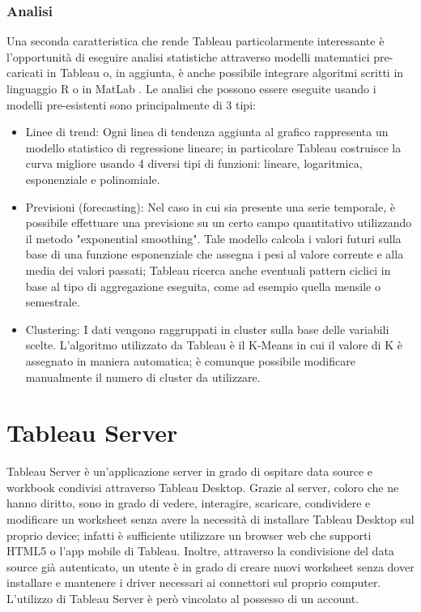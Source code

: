 \subsubsection{Analisi}

Una seconda caratteristica che rende Tableau particolarmente interessante è l'opportunità di eseguire analisi statistiche attraverso modelli matematici pre-caricati in Tableau o, in aggiunta, è anche possibile integrare algoritmi scritti in linguaggio R o in MatLab \cite{analisi_tableau}. Le analisi che possono essere eseguite usando i modelli pre-esistenti sono principalmente di 3 tipi:

\begin{itemize}
    \item Linee di trend: Ogni linea di tendenza aggiunta al grafico rappresenta un modello statistico di regressione lineare; in particolare Tableau costruisce la curva migliore usando 4 diversi tipi di funzioni: lineare, logaritmica, esponenziale e polinomiale.
    \item Previsioni (forecasting): Nel caso in cui sia presente una serie temporale, è possibile effettuare una previsione su un certo campo quantitativo utilizzando il metodo "exponential smoothing". Tale modello calcola i valori futuri sulla base di una funzione esponenziale che assegna i pesi al valore corrente e alla media dei valori passati; Tableau ricerca anche eventuali pattern ciclici in base al tipo di aggregazione eseguita, come ad esempio quella mensile o semestrale.
    \item Clustering: I dati vengono raggruppati in cluster sulla base delle variabili scelte. L'algoritmo utilizzato da Tableau è il K-Means in cui il valore di K è assegnato in maniera automatica; è comunque possibile modificare manualmente il numero di cluster da utilizzare.
\end{itemize}

\section{Tableau Server}

Tableau Server è un'applicazione server in grado di ospitare data source e workbook condivisi attraverso Tableau Desktop. Grazie al server, coloro che ne hanno diritto, sono in grado di vedere, interagire, scaricare, condividere e modificare un worksheet senza avere la necessità di installare Tableau Desktop sul proprio device; infatti è sufficiente utilizzare un browser web che supporti HTML5 o l'app mobile di Tableau. Inoltre, attraverso la condivisione del data source già autenticato, un utente è in grado di creare nuovi worksheet senza dover installare e mantenere i driver necessari ai connettori sul proprio computer. L'utilizzo di Tableau Server è però vincolato al possesso di un account.

